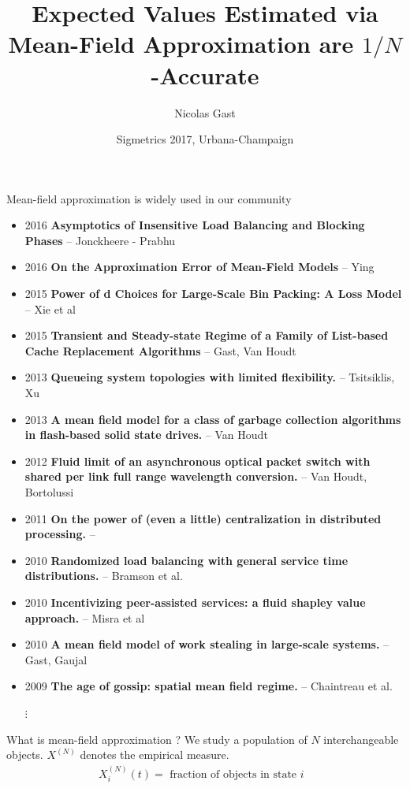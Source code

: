 \documentclass{beamer}
\newcommand\XN{X^{(N)}}
\begin{document}
\title{Expected Values Estimated via Mean-Field Approximation are
  $1/N$-Accurate }%
\author{Nicolas Gast}%
%
\date[Urbana-Champaign, June 2017]{Sigmetrics 2017, Urbana-Champaign }%

\maketitle


\newcommand\newcite[3]{\item[#1] \textbf{#2} -- #3}
\begin{frame}{Mean-field approximation is widely used in our
    community}
  
  \footnotesize 
  \begin{itemize}
  \newcite{2016}{ Asymptotics of Insensitive Load Balancing and Blocking
    Phases}{Jonckheere - Prabhu}
  \newcite{2016}{ On the Approximation Error of Mean-Field Models}{Ying}
  \newcite{2015}{ Power of d Choices for Large-Scale Bin Packing: A Loss
    Model}{Xie et al} 
  \newcite{2015}{ Transient and Steady-state Regime of a Family of
    List-based Cache Replacement Algorithms}{Gast, Van Houdt} 
  \newcite{2013}{  Queueing system topologies with limited
    flexibility.}{Tsitsiklis, Xu}
  \newcite{2013}{ A mean field model for a class of garbage collection
    algorithms in flash-based solid state drives.}{Van Houdt}
  \newcite{2012}{ Fluid limit of an asynchronous optical packet switch
    with shared per link full range wavelength conversion.}{Van Houdt,
    Bortolussi}

  \newcite{2011}{ On the power of (even a little) centralization in
    distributed processing. }
  \newcite{2010}{ Randomized load balancing with general service time
    distributions.}{Bramson et al.}
  \newcite{2010}{ Incentivizing peer-assisted services: a fluid shapley
    value approach.}{Misra et al}
  \newcite{2010}{ A mean field model of work stealing in large-scale
    systems.}{Gast, Gaujal} 
  \newcite{2009}{
The age of gossip: spatial mean field regime.}{Chaintreau et al.}
\item[$\vdots$~~]
  \end{itemize}
\end{frame}

\newcommand\object[1]{\node[fill] at (#1) {~};}
\begin{frame}{What is mean-field approximation ?}
  {We study a population of $N$ interchangeable objects. }
  $\XN$ denotes the empirical measure.
  \begin{align*}
    \XN_i(t) = \text{ fraction of objects in state $i$ }
  \end{align*}
  

\end{frame}
\end{document}
